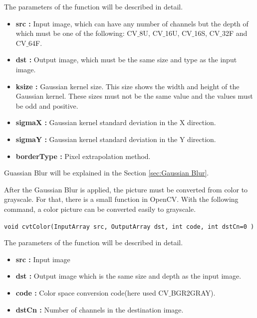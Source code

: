 The parameters of the function will be described in detail.\cite{GaussianBlur}
 
\begin{itemize}

\item \textbf{src : }Input image, which can have any number of channels but the depth of which must be one of the following: CV$\_$8U, CV$\_$16U, CV$\_$16S, CV$\_$32F and CV$\_$64F.
 
\item \textbf{dst : }Output image, which must be the same size and type as the input image.

\item \textbf{ksize : }Gaussian kernel size. This size shows the width and height of the Gaussian kernel. These sizes must not be the same value and the values must be odd and positive.

\item \textbf{sigmaX : }Gaussian kernel standard deviation in the X direction.

\item \textbf{sigmaY : }Gaussian kernel standard deviation in the Y direction.

\item \textbf{borderType : }Pixel extrapolation method.

\end{itemize}


Guassian Blur will be explained in the Section \ref{sec:Gaussian Blur}.


After the Gaussian Blur is applied, the picture must be converted from color to grayscale. For that, there is a small function in OpenCV. With the following command, a color picture can be converted easily to grayscale.

 \begin{center}
 
\texttt{void cvtColor(InputArray src, OutputArray dst, int code, int dstCn=0 )}

 \end{center}
 
 The parameters of the function will be described in detail.
 
 \begin{itemize}

\item \textbf{src : }Input image
 
\item \textbf{dst : }Output image which is the same size and depth as the input image.

\item \textbf{code : }Color space conversion code(here used CV$ \_ $BGR2GRAY).

\item \textbf{dstCn : }Number of channels in the destination image.


\end{itemize}

